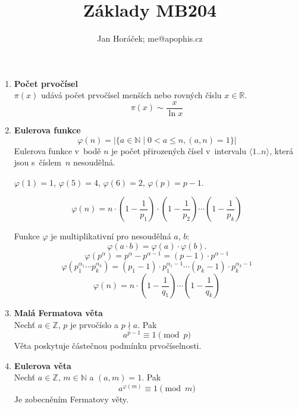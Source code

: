 \documentclass[12pt,a4paper]{article}
\begin{document}
\title{Základy MB204}
\author{Jan Horáček; me@apophis.cz}
\maketitle

\begin{enumerate}
	\item \textbf{Počet prvočísel}\\
		$\pi(x)$ udává počet prvočísel menších nebo rovných číslu $x \in \mathbb{R}$. \\
		\[ \pi(x) \sim \frac{x}{\ln{x}} \]


	\item \textbf{Eulerova funkce}
		\[ \varphi(n) = |\{ a \in \mathbb{N} \mid 0 < a \le n, (a,n) = 1\}| \]
		Eulerova funkce v~bodě $n$ je počet přirozených čísel v~intervalu
		$\langle 1..n \rangle$, která jsou s~číslem~$n$ nesoudělná.

		$\varphi(1) = 1$, $\varphi(5) = 4$, $\varphi(6) = 2$, $\varphi(p) = p-1$.

		\[ \varphi(n) = n \cdot \left( 1 - \frac{1}{p_1} \right) \cdot
			\left( 1 - \frac{1}{p_2} \right) \cdots \left( 1 - \frac{1}{p_k} \right) \]

		Funkce $\varphi$ je multiplikativní pro nesoudělná $a$, $b$:
		\[ \varphi(a \cdot b) = \varphi(a) \cdot \varphi(b). \]
		\[ \varphi(p^\alpha) = p^\alpha - p^{\alpha-1} = (p - 1) \cdot p^{\alpha-1}\]
		\[ \varphi(p_1^{\alpha_1} \cdots p_k^{\alpha_k}) = (p_1 - 1) \cdot
			p_1^{\alpha_1-1} \cdots (p_k - 1) \cdot p_k^{\alpha_k-1} \]
		\[ \varphi(n) = n \cdot \left( 1 - \frac{1}{q_1} \right) \cdots
			\left( 1 - \frac{1}{q_k} \right) \]

	\item \textbf{Malá Fermatova věta}\\
		Nechť $a \in \mathbb{Z}$, $p$ je prvočíslo a $p \nmid a$. Pak
		\[ a^{p-1} \equiv 1 \pmod{p} \]
		Věta poskytuje částečnou podmínku prvočíselnosti.

	\item \textbf{Eulerova věta}\\
		Nechť $a \in \mathbb{Z}$, $m \in \mathbb{N}$ a $(a,m) = 1$. Pak
		\[ a^{\varphi(m)} \equiv 1 \pmod{m} \]
		Je zobecněním Fermatovy věty.


\end{enumerate}
\end{document}
